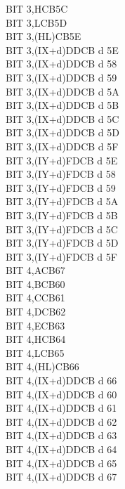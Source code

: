 \begin{multicols}{3}
{\begin{tabbing}
        BIT 3,H\>CB5C\\
        BIT 3,L\>CB5D\\
        BIT 3,(HL)\>CB5E\\
        BIT 3,(IX+d)\>DDCB d 5E\\
        BIT 3,(IX+d)\UNDOC\>DDCB d 58\\
        BIT 3,(IX+d)\UNDOC\>DDCB d 59\\
        BIT 3,(IX+d)\UNDOC\>DDCB d 5A\\
        BIT 3,(IX+d)\UNDOC\>DDCB d 5B\\
        BIT 3,(IX+d)\UNDOC\>DDCB d 5C\\
        BIT 3,(IX+d)\UNDOC\>DDCB d 5D\\
        BIT 3,(IX+d)\UNDOC\>DDCB d 5F\\
        BIT 3,(IY+d)\>FDCB d 5E\\
        BIT 3,(IY+d)\UNDOC\>FDCB d 58\\
        BIT 3,(IY+d)\UNDOC\>FDCB d 59\\
        BIT 3,(IY+d)\UNDOC\>FDCB d 5A\\
        BIT 3,(IY+d)\UNDOC\>FDCB d 5B\\
        BIT 3,(IY+d)\UNDOC\>FDCB d 5C\\
        BIT 3,(IY+d)\UNDOC\>FDCB d 5D\\
        BIT 3,(IY+d)\UNDOC\>FDCB d 5F\\
        BIT 4,A\>CB67\\
        BIT 4,B\>CB60\\
        BIT 4,C\>CB61\\
        BIT 4,D\>CB62\\
        BIT 4,E\>CB63\\
        BIT 4,H\>CB64\\
        BIT 4,L\>CB65\\
        BIT 4,(HL)\>CB66\\
        BIT 4,(IX+d)\>DDCB d 66\\
        BIT 4,(IX+d)\UNDOC\>DDCB d 60\\
        BIT 4,(IX+d)\UNDOC\>DDCB d 61\\
        BIT 4,(IX+d)\UNDOC\>DDCB d 62\\
        BIT 4,(IX+d)\UNDOC\>DDCB d 63\\
        BIT 4,(IX+d)\UNDOC\>DDCB d 64\\
        BIT 4,(IX+d)\UNDOC\>DDCB d 65\\
        BIT 4,(IX+d)\UNDOC\>DDCB d 67\\

\end{tabbing}}
\end{multicols}
